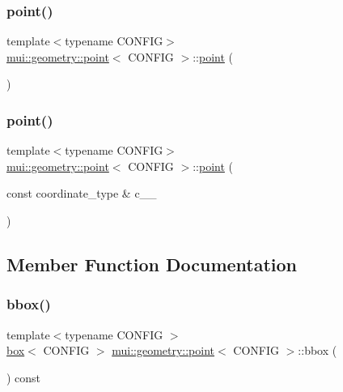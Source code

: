 \subsubsection{\texorpdfstring{point()}{point()}\hspace{0.1cm}{\footnotesize\ttfamily [1/2]}}
{\footnotesize\ttfamily template$<$typename C\+O\+N\+F\+IG$>$ \\
\hyperlink{classmui_1_1geometry_1_1point}{mui\+::geometry\+::point}$<$ C\+O\+N\+F\+IG $>$\+::\hyperlink{classmui_1_1geometry_1_1point}{point} (\begin{DoxyParamCaption}{ }\end{DoxyParamCaption})\hspace{0.3cm}{\ttfamily [default]}}

\mbox{\label{classmui_1_1geometry_1_1point_a97c421465c3aa63bccc7ae981c27c57d}} 
\subsubsection{\texorpdfstring{point()}{point()}\hspace{0.1cm}{\footnotesize\ttfamily [2/2]}}
{\footnotesize\ttfamily template$<$typename C\+O\+N\+F\+IG$>$ \\
\hyperlink{classmui_1_1geometry_1_1point}{mui\+::geometry\+::point}$<$ C\+O\+N\+F\+IG $>$\+::\hyperlink{classmui_1_1geometry_1_1point}{point} (\begin{DoxyParamCaption}\item[{const coordinate\+\_\+type \&}]{c\+\_\+\+\_\+ }\end{DoxyParamCaption})\hspace{0.3cm}{\ttfamily [inline]}}



\subsection{Member Function Documentation}
\mbox{\label{classmui_1_1geometry_1_1point_ac858e6315e18e6e2a16166e4db748e32}} 
\subsubsection{\texorpdfstring{bbox()}{bbox()}}
{\footnotesize\ttfamily template$<$typename C\+O\+N\+F\+IG $>$ \\
\hyperlink{classmui_1_1geometry_1_1box}{box}$<$ C\+O\+N\+F\+IG $>$ \hyperlink{classmui_1_1geometry_1_1point}{mui\+::geometry\+::point}$<$ C\+O\+N\+F\+IG $>$\+::bbox (\begin{DoxyParamCaption}{ }\end{DoxyParamCaption}) const\hspace{0.3cm}{\ttfamily [virtual]}}



